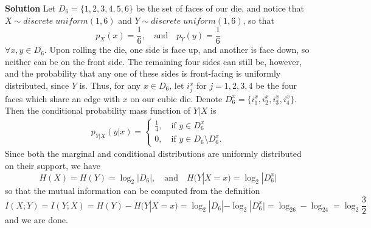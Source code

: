 \documentclass[11pt, letterpaper]{article}
\begin{document}
{\bf Solution} Let $D_6=\{1,2,3,4,5,6\}$ be the set of faces of our die, and notice that $X\sim discrete\;uniform(1,6)$ and $Y\sim discrete\;uniform(1,6)$, so that
\[p_X(x)=\frac{1}{6},\quad\text{and}\quad p_Y(y)=\frac{1}{6}\]
$\forall x,y\in D_6$. Upon rolling the die, one side is face up, and another is face down, so neither can be on the front side. The remaining four sides can still be, however, and
the probability that any one of these sides is front-facing is uniformly distributed, since $Y$ is. Thus, for any $x\in D_6$, let $i_j^x$ for $j=1,2,3,4$ be the four faces which share an edge with
$x$ on our cubic die. Denote $D_6^x=\{i^x_1,i^x_2,i^x_3,i^x_4\}$. Then the conditional probability mass function of $Y|X$ is
\begin{align*}
    p_{Y|X}(y|x)=\begin{cases}
        \frac{1}{4},\quad\text{if $y\in D_6^x$}\\
        0,\quad\text{if $y\in D_6\setminus D_6^x$}.
    \end{cases}
\end{align*}
Since both the marginal and conditional distributions are uniformly distributed on their support, we have
\[H(X)=H(Y)=\log_2|D_6|,\quad\text{and}\quad H(Y|X=x)=\log_2|D_6^x|\tag{Lemma 2.6}\]
so that the mutual information can be computed from the definition
\[I(X;Y)=I(Y;X)=H(Y)-H(Y|X=x)=\log_2|D_6|-\log_2|D_6^x|=\log_26-\log_24=\log_2\frac{3}{2}\]
and we are done.\\[10pt]
\end{document}
